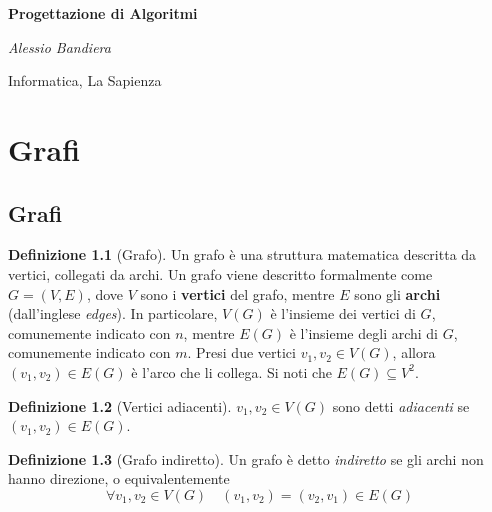 \documentclass[14pt]{extreport}
\theoremstyle{definition}
\newtheorem{definition}{Definizione}[section]
\theoremstyle{remark}
\begin{document}
\begin{titlepage}
    \centering
    \vspace*{1cm}

    \textbf{\huge Progettazione di Algoritmi}

    \vspace{1.5cm}

    \textit{\Large Alessio Bandiera}

    \vfill
        
    \large Informatica, La Sapienza
\end{titlepage}

\tableofcontents

\pagebreak


\chapter{Grafi}

\section{Grafi}

\begin{definition}[Grafo]
    Un grafo è una struttura matematica descritta da vertici, collegati da archi. Un grafo viene descritto formalmente come $G=(V, E)$, dove $V$ sono i \textbf{vertici} del grafo, mentre $E$ sono gli \textbf{archi} (dall'inglese \textit{edges}). In particolare, $V(G)$ è l'insieme dei vertici di $G$, comunemente indicato con $n$, mentre $E(G)$ è l'insieme degli archi di $G$, comunemente indicato con $m$. Presi due vertici $v_1,v_2 \in V(G)$, allora $(v_1, v_2) \in E(G)$ è l'arco che li collega. Si noti che $E(G) \subseteq V^2$.
\end{definition}

\begin{definition}[Vertici adiacenti]
    $v_1, v_2 \in V(G)$ sono detti \textit{adiacenti} se $(v_1, v_2) \in E(G)$.
\end{definition}

\begin{definition}[Grafo indiretto]
    Un grafo è detto \textit{indiretto} se gli archi non hanno direzione, o equivalentemente $$\forall v_1, v_2 \in V(G) \quad (v_1, v_2) = (v_2, v_1) \in E(G)$$
\end{definition}
\end{document}

